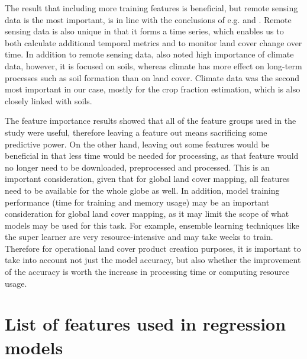 \documentclass[review,authoryear,3p]{elsarticle}
\begin{document}
The result that including more training features is beneficial, but remote sensing data is the most important, is in line with the conclusions of e.g. \citet{li_monitoring_2018} and \citet{hengl_soilgrids250m_2017}.
Remote sensing data is also unique in that it forms a time series, which enables us to both calculate additional temporal metrics and to monitor land cover change over time.
In addition to remote sensing data, \citet{hengl_soilgrids250m_2017} also noted high importance of climate data, however, it is focused on soils, whereas climate has more effect on long-term processes such as soil formation than on land cover.
Climate data was the second most important in our case, mostly for the crop fraction estimation, which is also closely linked with soils.

The feature importance results showed that all of the feature groups used in the study were useful, therefore leaving a feature out means sacrificing some predictive power.
On the other hand, leaving out some features would be beneficial in that less time would be needed for processing, as that feature would no longer need to be downloaded, preprocessed and processed.
This is an important consideration, given that for global land cover mapping, all features need to be available for the whole globe as well.
In addition, model training performance (time for training and memory usage) may be an important consideration for global land cover mapping, as it may limit the scope of what models may be used for this task.
For example, ensemble learning techniques like the super learner are very resource-intensive and may take weeks to train.
Therefore for operational land cover product creation purposes, it is important to take into account not just the model accuracy, but also whether the improvement of the accuracy is worth the increase in processing time or computing resource usage.

\newpage

\section{List of features used in regression models} \label{sec-inputdata}
\end{document}
